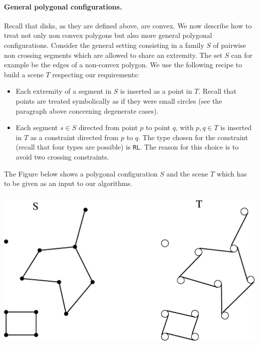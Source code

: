 \paragraph{General polygonal configurations. } Recall that disks, as they are defined
above, are convex. We now describe how to treat not only non convex polygons but
also more general polygonal configurations. Consider the general setting consisting in a 
family $S$ of pairwise non crossing segments which are allowed to share an
extremity. The set $S$ can for example be the edges of a non-convex polygon.
We use the following recipe to build a scene $T$ respecting our requirements:
\begin{itemize}
    \item Each extremity of a segment in $S$ is inserted as a point in $T$.
    Recall that points are treated symbolically as if they were small circles
    (see the paragraph above concerning degenerate cases). 
    \item Each segment $s \in S$ directed from point $p$ to point $q$, with $p,q
    \in T$ is inserted in $T$ as a constraint directed from $p$ to $q$. The type
    chosen for the constraint (recall that four types are possible) is
    \texttt{RL}. The reason for this choice is to avoid two crossing constraints.
\end{itemize}

The Figure below shows a polygonal configuration $S$ and the scene $T$ which
has to be given as an input to our algorithms. 

\begin{ccTexOnly}
    \begin{center}
	\includegraphics[height=8cm]{fig/configuration.eps}%
    \end{center}
\end{ccTexOnly}

